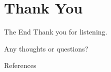 \documentclass{beamer}
\begin{document}
\section{Thank You}

\begin{frame}{The End}
    Thank you for listening.
    
    Any thoughts or questions?
\end{frame}

\begin{frame}[allowframebreaks]{References}
    \printbibliography
\end{frame}
\end{document}
